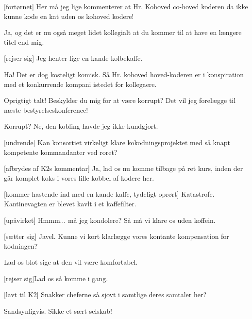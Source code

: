 \documentclass[a4paper,11pt]{article}
\begin{document}
\begin{sketch}
[fortørnet] Her må jeg lige kommenterer at Hr. Kohoved co-hoved koderen
da ikke kunne kode en kat uden os kohoved kodere!

 Ja, og det er nu også meget lidet kollegialt at du kommer til at have
en længere titel end mig. 

 [rejser sig] Jeg henter lige en kande kolbekaffe. 

 Ha! Det er dog kosteligt komisk. Så Hr. kohoved hoved-koderen er i
konspiration med et konkurrende kompani istedet for kollegaere.

 Oprigtigt talt! Beskylder du mig for at være korrupt? Det vil jeg
forelægge til næste bestyrelseskonference!

 Korrupt? Ne, den kobling havde jeg ikke kundgjort. 

[undrende] Kan konsortiet virkeligt klare kokodningsprojektet med så
knapt kompetente kommandanter ved roret?

[afbrydes af K2s kommentar] Ja, lad os nu komme tilbage på ret kurs,
inden der går komplet koks i vores lille kobbel af kodere her.

[kommer hastende ind med en kande kaffe, tydeligt oprørt]
Katastrofe. Kantinevagten er blevet kavlt i et kaffefilter.

[upåvirket] Hmmm... må jeg kondolere? Så må vi klare os uden koffein.

[sætter sig] Javel. Kunne vi kort klarlægge vores  kontante kompensation for kodningen?

 Lad os blot sige at den vil være komfortabel. 

[rejser sig]Lad os så komme i gang.


[lavt til K2] Snakker cheferne så sjovt i samtlige deres samtaler her?

 Sandsynligvis. Sikke et sært selskab!    


\end{sketch}
\end{document}
